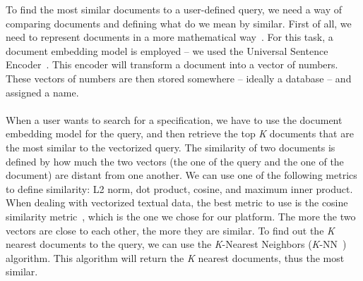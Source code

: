 To find the most similar documents to a user-defined query, we need a way of comparing documents and defining what do we mean by similar.
First of all, we need to represent documents in a more mathematical way~\cite{dai_document_2015}.
For this task, a document embedding model is employed -- we used the Universal Sentence Encoder~\cite{cer_universal_2018}.
This encoder will transform a document into a vector of numbers.
These vectors of numbers are then stored somewhere -- ideally a database -- and assigned a name. \\ \\
When a user wants to search for a specification, we have to use the document embedding model for the query, and then retrieve the top \textit{K} documents that are the most similar to the vectorized query.
The similarity of two documents is defined by how much the two vectors (the one of the query and the one of the document) are distant from one another.
We can use one of the following metrics to define similarity: L2 norm, dot product, cosine, and maximum inner product.
When dealing with vectorized textual data, the best metric to use is the cosine similarity metric~\cite{guo_testing_2022}, which is the one we chose for our platform.
The more the two vectors are close to each other, the more they are similar.
To find out the \textit{K} nearest documents to the query, we can use the \textit{K}-Nearest Neighbors (\textit{K}-NN~\cite{cover_nearest_1967}) algorithm.
This algorithm will return the \textit{K} nearest documents, thus the most similar.
